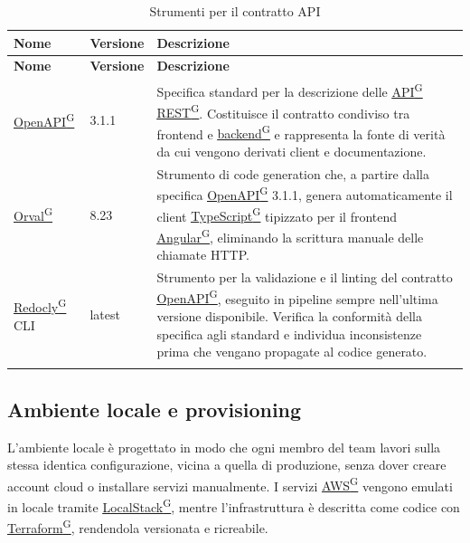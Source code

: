 \documentclass[a4paper,12pt]{article}
\providecommand{\glslink}[2]{\href{https://alittlebyte-19.github.io/Documentazione/glossario.html\#gls-#1}{\underline{#2}\textsuperscript{\scriptsize G}}}
\begin{document}
\renewcommand{\arraystretch}{1.3}
{\small
\setlength{\LTleft}{0pt}
\setlength{\LTright}{0pt}
\begin{longtable}{|p{3cm}|p{1.8cm}|p{9.7cm}|}
    \hline
    \rowcolor{gray!20}
    \textbf{Nome} & \textbf{Versione} & \textbf{Descrizione} \\
    \hline
    \endfirsthead
    \hline
    \rowcolor{gray!20}
    \textbf{Nome} & \textbf{Versione} & \textbf{Descrizione} \\
    \hline
    \endhead
    \glslink{openapi}{OpenAPI} & 3.1.1 & Specifica standard per la descrizione delle \glslink{api-application-programming-interface}{API} \glslink{rest-representational-state-transfer}{REST}. Costituisce il contratto condiviso tra frontend e \glslink{backend}{backend} e rappresenta la fonte di verità da cui vengono derivati client e documentazione. \\
    \hline
    \glslink{orval}{Orval} & 8.23 & Strumento di code generation che, a partire dalla specifica \glslink{openapi}{OpenAPI} 3.1.1, genera automaticamente il client \glslink{typescript}{TypeScript} tipizzato per il frontend \glslink{angular}{Angular}, eliminando la scrittura manuale delle chiamate HTTP. \\
    \hline
    \glslink{redocly}{Redocly} CLI & latest & Strumento per la validazione e il linting del contratto \glslink{openapi}{OpenAPI}, eseguito in pipeline sempre nell'ultima versione disponibile. Verifica la conformità della specifica agli standard e individua inconsistenze prima che vengano propagate al codice generato. \\
    \hline
    \caption{Strumenti per il contratto API}
\end{longtable}
}

\subsection{Ambiente locale e provisioning}

L'ambiente locale è progettato in modo che ogni membro del team lavori sulla stessa identica configurazione, vicina a quella di produzione, senza dover creare account cloud o installare servizi manualmente. I servizi \glslink{aws}{AWS} vengono emulati in locale tramite \glslink{localstack}{LocalStack}, mentre l'infrastruttura è descritta come codice con \glslink{terraform}{Terraform}, rendendola versionata e ricreabile.
\end{document}
